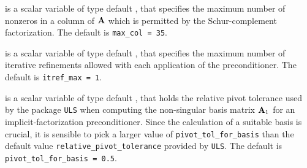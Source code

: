 \documentclass{galahad}
\begin{document}
\begin{description}
 is a scalar variable of type default \integer, that specifies
the maximum number of nonzeros in a column of ${\mathbf{A}}$ which is permitted
by the Schur-complement factorization.
The default is {\tt max\_col = 35}.




 is a scalar variable of type default \integer, that specifies
the maximum number of iterative refinements allowed with each application
of the preconditioner.
The default is {\tt itref\_max = 1}.




 is a scalar variable of type default
\realdp, that holds the relative
pivot tolerance used by the package {\tt ULS}
when computing the non-singular basis matrix ${\mathbf{A}}_1$ for
an implicit-factorization preconditioner. Since the calculation of a
suitable basis is crucial, it is sensible to pick a larger
value of {\tt pivot\_tol\_for\_basis} than
the default value {\tt relative\_pivot\_tolerance} provided by {\tt ULS}.
The default is {\tt pivot\_tol\_for\_basis = 0.5}.



\end{description}
\end{document}
